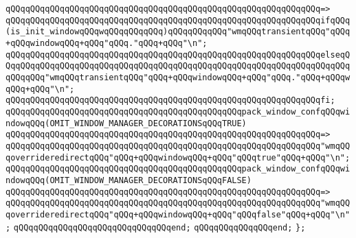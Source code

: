 \verb|qQQqqQQqqQQqqQQqqQQqqQQqqQQqqQQqqQQqqQQqqQQqqQQqqQQqqQQqqQQqqQQq=>|\newline
\verb|qQQqqQQqqQQqqQQqqQQqqQQqqQQqqQQqqQQqqQQqqQQqqQQqqQQqqQQqqQQqqQQqifqQQq(is_init_windowqQQqwqQQqqQQqqQQq)qQQqqQQqqQQq"wmqQQqtransientqQQq"qQQq+qQQqwindowqQQq+qQQq"qQQq."qQQq+qQQq"\n";|\newline
\verb|qQQqqQQqqQQqqQQqqQQqqQQqqQQqqQQqqQQqqQQqqQQqqQQqqQQqqQQqqQQqqQQqelseqQQqqQQqqQQqqQQqqQQqqQQqqQQqqQQqqQQqqQQqqQQqqQQqqQQqqQQqqQQqqQQqqQQqqQQqqQQqqQQq"wmqQQqtransientqQQq"qQQq+qQQqwindowqQQq+qQQq"qQQq."qQQq+qQQqwqQQq+qQQq"\n";|\newline
\verb|qQQqqQQqqQQqqQQqqQQqqQQqqQQqqQQqqQQqqQQqqQQqqQQqqQQqqQQqqQQqqQQqfi;|\newline
\newline
\verb|qQQqqQQqqQQqqQQqqQQqqQQqqQQqqQQqqQQqqQQqqQQqqQQqpack_window_confqQQqwindowqQQq(OMIT_WINDOW_MANAGER_DECORATIONSqQQqTRUE)|\newline
\verb|qQQqqQQqqQQqqQQqqQQqqQQqqQQqqQQqqQQqqQQqqQQqqQQqqQQqqQQqqQQqqQQq=>|\newline
\verb|qQQqqQQqqQQqqQQqqQQqqQQqqQQqqQQqqQQqqQQqqQQqqQQqqQQqqQQqqQQqqQQq"wmqQQqoverrideredirectqQQq"qQQq+qQQqwindowqQQq+qQQq"qQQqtrue"qQQq+qQQq"\n";|\newline
\newline
\verb|qQQqqQQqqQQqqQQqqQQqqQQqqQQqqQQqqQQqqQQqqQQqqQQqpack_window_confqQQqwindowqQQq(OMIT_WINDOW_MANAGER_DECORATIONSqQQqFALSE)|\newline
\verb|qQQqqQQqqQQqqQQqqQQqqQQqqQQqqQQqqQQqqQQqqQQqqQQqqQQqqQQqqQQqqQQq=>|\newline
\verb|qQQqqQQqqQQqqQQqqQQqqQQqqQQqqQQqqQQqqQQqqQQqqQQqqQQqqQQqqQQqqQQq"wmqQQqoverrideredirectqQQq"qQQq+qQQqwindowqQQq+qQQq"qQQqfalse"qQQq+qQQq"\n";|\newline
\verb|qQQqqQQqqQQqqQQqqQQqqQQqqQQqqQQqend;|\newline
\newline
\verb|qQQqqQQqqQQqqQQqend;|\newline
\verb|};|\newline
\newline

